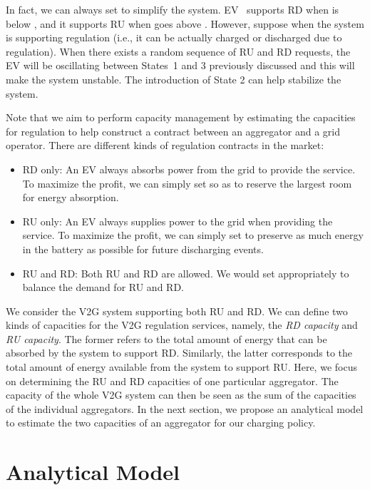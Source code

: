 \documentclass[journal]{IEEEtran}
\begin{document}
In fact, we can always set  to simplify the
system.  EV~ supports RD when  is below
, and it supports RU when  goes above
.  However, suppose 
when the system is supporting regulation (i.e., it can be actually charged or discharged due to
regulation).  When there exists a random sequence of RU and
RD requests,
the EV will be oscillating between States~1 and 3 previously discussed and
this will make the system unstable.  The introduction of State 2 can help stabilize
the system.

Note that we aim to perform capacity management by estimating the capacities
for regulation to help construct a contract between an aggregator and a grid
operator.  There are different kinds of regulation contracts in the market: 
\begin{itemize}
\item RD only: An EV always absorbs power from the grid to provide the service.  To maximize
the profit, we can simply set  so as to
reserve the largest room for energy absorption.

\item RU only: An EV always supplies power to the grid when providing the service.  To
maximize the profit, we can simply set 
to preserve as much energy in the battery as possible for future discharging
events.

\item RU and RD: Both RU and RD are allowed.  We would set
 appropriately to balance the demand for RU
and RD. 
\end{itemize}


We consider the V2G system supporting both RU and
RD.  We can define two kinds of capacities for the V2G regulation
services, namely, the \textit{RD capacity} and
\textit{RU capacity}.  The former refers to the total amount of
energy that can be absorbed by the system to support RD.
Similarly, the latter corresponds to the total amount of energy available from
the system to support RU.  Here, we focus on determining the
RU and RD capacities of one particular aggregator.  The
capacity of the whole V2G system can then be seen as the sum of the capacities
of the individual aggregators.  In the next section, we propose an analytical
model to estimate the two capacities of an aggregator for our charging policy.

\section{Analytical Model} \label{sec:model}
\end{document}
